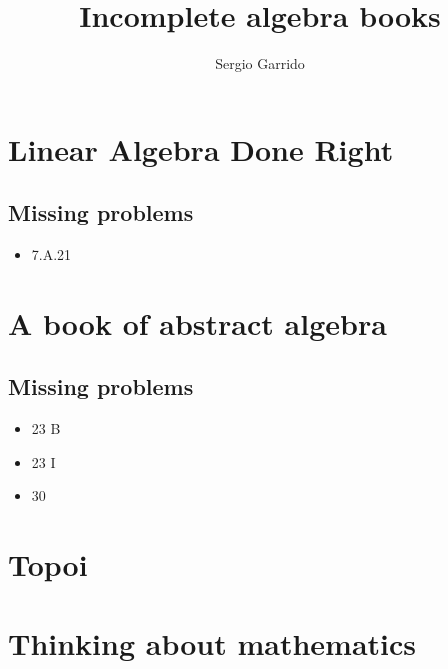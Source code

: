 \documentclass{bookSolutions}
\title{Incomplete algebra books}
\author{Sergio Garrido}
\begin{document}
\tableofcontents
\newpage

\section{Linear Algebra Done Right}
\subsection{Missing problems}
\begin{itemize}
    \item 7.A.21
\end{itemize}

















\newpage
\section{A book of abstract algebra}
\subsection{Missing problems}
\begin{itemize}
    \item 23 B
    \item 23 I
    \item 30
\end{itemize}


















\newpage
\section{Topoi}


\newpage
\section{Thinking about mathematics}

\end{document}
